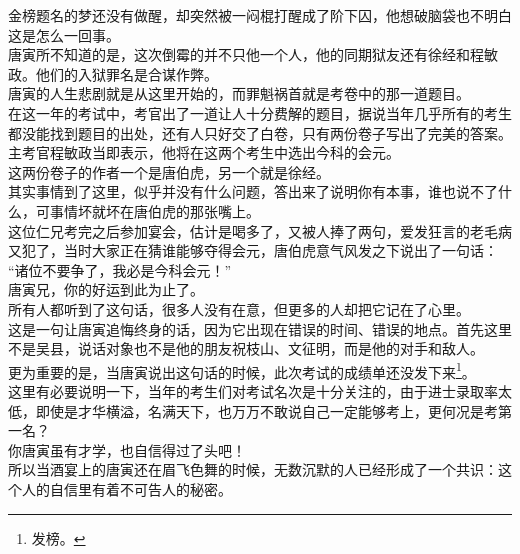 \begin{multicols}{\theparacolNo}
金榜题名的梦还没有做醒，却突然被一闷棍打醒成了阶下囚，他想破脑袋也不明白这是怎么一回事。\\

唐寅所不知道的是，这次倒霉的并不只他一个人，他的同期狱友还有徐经和程敏政。他们的入狱罪名是合谋作弊。\\

唐寅的人生悲剧就是从这里开始的，而罪魁祸首就是考卷中的那一道题目。\\

在这一年的考试中，考官出了一道让人十分费解的题目，据说当年几乎所有的考生都没能找到题目的出处，还有人只好交了白卷，只有两份卷子写出了完美的答案。\\

主考官程敏政当即表示，他将在这两个考生中选出今科的会元。\\

这两份卷子的作者一个是唐伯虎，另一个就是徐经。\\

其实事情到了这里，似乎并没有什么问题，答出来了说明你有本事，谁也说不了什么，可事情坏就坏在唐伯虎的那张嘴上。\\

这位仁兄考完之后参加宴会，估计是喝多了，又被人捧了两句，爱发狂言的老毛病又犯了，当时大家正在猜谁能够夺得会元，唐伯虎意气风发之下说出了一句话：\\

“诸位不要争了，我必是今科会元！”\\

唐寅兄，你的好运到此为止了。\\

所有人都听到了这句话，很多人没有在意，但更多的人却把它记在了心里。\\

这是一句让唐寅追悔终身的话，因为它出现在错误的时间、错误的地点。首先这里不是吴县，说话对象也不是他的朋友祝枝山、文征明，而是他的对手和敌人。\\

更为重要的是，当唐寅说出这句话的时候，此次考试的成绩单还没发下来\footnote{发榜。}。\\

这里有必要说明一下，当年的考生们对考试名次是十分关注的，由于进士录取率太低，即使是才华横溢，名满天下，也万万不敢说自己一定能够考上，更何况是考第一名？\\

你唐寅虽有才学，也自信得过了头吧！\\

所以当酒宴上的唐寅还在眉飞色舞的时候，无数沉默的人已经形成了一个共识：这个人的自信里有着不可告人的秘密。\\


\end{multicols}

